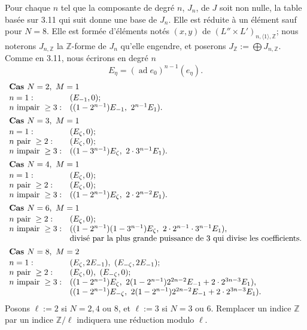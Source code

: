 \documentclass[10pt,a4paper]{article}
\newcommand{\Z}{\mathbb Z}
\newcommand{\ad}{\operatorname{ad}}
\theoremstyle{deligne}
\newcommand{\heading}[1]{\vspace{0.65em}\noindent{\bfseries #1}\quad}
\begin{document}
\heading{4.8.} Pour chaque \(n\) tel que la composante de degré \(n\), \(J_n\), de \(J\) soit non nulle, la table basée sur 3.11 qui suit donne une base de \(J_n\). Elle est réduite à un élément sauf pour \(N=8\). Elle est formée d'éléments notés \((x,y)\) de \((L''\times L')_{n,\langle1\rangle,\Z}\); nous noterons \(J_{n,\Z}\) la \(\Z\)-forme de \(J_n\) qu'elle engendre, et poserons \(J_{\Z}:=\bigoplus J_{n,\Z}\). Comme en 3.11, nous écrirons en degré \(n\)
\[
E_\eta=(\ad e_0)^{n-1}(e_\eta).
\]
\[
\begin{array}{ll}
\multicolumn{2}{l}{\textbf{Cas }N=2,\ M=1}\\[0.15em]
n=1: & (E_{-1},0);\\
n\hbox{ impair }\ge3: & ((1-2^{n-1})E_{-1},\ 2^{n-1}E_1).\\[0.45em]
\multicolumn{2}{l}{\textbf{Cas }N=3,\ M=1}\\[0.15em]
n=1: & (E_\zeta,0);\\
n\hbox{ pair }\ge2: & (E_\zeta,0);\\
n\hbox{ impair }\ge3: & ((1-3^{n-1})E_\zeta,\ 2\cdot3^{n-1}E_1).\\[0.45em]
\multicolumn{2}{l}{\textbf{Cas }N=4,\ M=1}\\[0.15em]
n=1: & (E_\zeta,0);\\
n\hbox{ pair }\ge2: & (E_\zeta,0);\\
n\hbox{ impair }\ge3: & ((1-2^{n-1})E_\zeta,\ 2\cdot2^{n-2}E_1).\\[0.45em]
\multicolumn{2}{l}{\textbf{Cas }N=6,\ M=1}\\[0.15em]
n\hbox{ pair }\ge2: & (E_\zeta,0);\\
n\hbox{ impair }\ge3: & ((1-2^{n-1})(1-3^{n-1})E_\zeta,\ 2\cdot2^{n-1}\cdot3^{n-1}E_1),\\
& \text{divisé par la plus grande puissance de }3\text{ qui divise les coefficients}.\\[0.45em]
\multicolumn{2}{l}{\textbf{Cas }N=8,\ M=2}\\[0.15em]
n=1: & (E_\zeta,2E_{-1}),\ (E_{-\zeta},2E_{-1});\\
n\hbox{ pair }\ge2: & (E_\zeta,0),\ (E_{-\zeta},0);\\
n\hbox{ impair }\ge3: & ((1-2^{n-1})E_\zeta,\ 2(1-2^{n-1})2^{2n-2}E_{-1}+2\cdot2^{3n-3}E_1),\\
& ((1-2^{n-1})E_{-\zeta},\ 2(1-2^{n-1})2^{2n-2}E_{-1}+2\cdot2^{3n-3}E_1).
\end{array}
\]
Posons \(\ell:=2\) si \(N=2,4\) ou \(8\), et \(\ell:=3\) si \(N=3\) ou \(6\). Remplacer un indice \(\Z\) par un indice \(\Z/\ell\) indiquera une réduction modulo \(\ell\).
\end{document}
